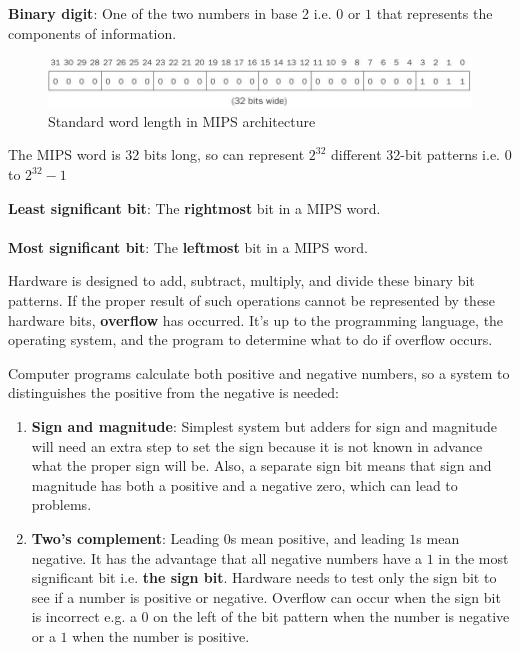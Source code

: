 \documentclass[10pt,a4paper]{article}
\begin{document}
\begin{tcolorbox}[breakable,colback=white]
\textbf{Binary digit}: One of the two numbers in base 2 i.e. $0$ or $1$ that represents the components of information.
\end{tcolorbox}

\begin{figure} [h!]
    \centering
    \includegraphics[scale=0.65]{MIPS 32 bit.JPG}
    \caption{Standard word length in MIPS architecture}
\end{figure}

The MIPS word is 32 bits long, so can represent $2^{32}$ different 32-bit patterns i.e. $0$ to $2^{32}-1$ 

\begin{tcolorbox}[breakable,colback=white]
\textbf{Least significant bit}: The \textbf{rightmost} bit in a MIPS word.
\\
\\
\textbf{Most significant bit}: The \textbf{leftmost} bit in a MIPS word.
\end{tcolorbox}

Hardware is designed to add, subtract, multiply, and divide these binary bit patterns. If the proper
result of such operations cannot be represented by these hardware bits, \textbf{overflow} has occurred. It’s up to the programming language, the operating system, and the program to determine what to do if overflow occurs.

Computer programs calculate both positive and negative numbers, so a system to distinguishes the
positive from the negative is needed:
\begin{enumerate}
    \item \textbf{Sign and magnitude}: Simplest system but adders for sign and magnitude will need
    an extra step to set the sign because it is not known in advance what the proper sign will be.
    Also, a separate sign bit means that sign and magnitude has both a positive and a negative 
    zero, which can lead to problems.
    \item \textbf{Two’s complement}: Leading $0$s mean positive, and leading $1$s mean negative. It
    has the advantage that all negative numbers have a $1$ in the most significant bit i.e. \textbf{the sign
    bit}. Hardware needs to test only the sign bit to see if a number is positive or negative. Overflow 
    can occur when the sign bit is incorrect e.g. a $0$ on the left of the bit pattern when the number is negative or a $1$ when the number is positive.
\end{enumerate}
\end{document}
